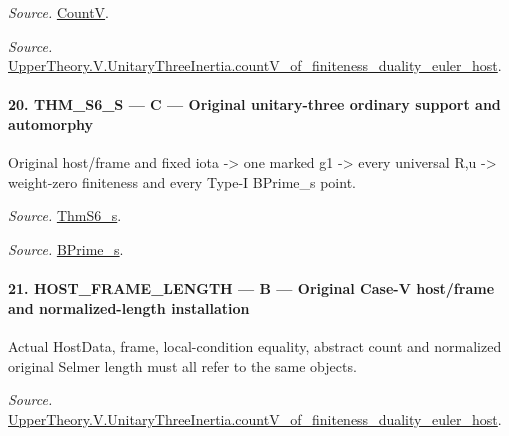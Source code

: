 \emph{Source.} \href{https://github.com/CocoSgt/riemann-hypothesis-lean/blob/7cbf7a0c32fca1badf05931879a37c3f8a2b03b4/src/Development/AutomorphicArithmetic/AutomorphicVarieties/HeightAndVanishing/Counts.lean#L69-L69}{CountV}.

\emph{Source.} \href{https://github.com/CocoSgt/riemann-hypothesis-lean/blob/7cbf7a0c32fca1badf05931879a37c3f8a2b03b4/src/Development/AutomorphicArithmetic/AutomorphicVarieties/ModularityArgument/ThresholdArguments/DenseThresholdCases/CountVOf.lean#L33-L60}{UpperTheory.V.UnitaryThreeInertia.countV\_\allowbreak of\_\allowbreak finiteness\_\allowbreak duality\_\allowbreak euler\_\allowbreak host}.



\paragraph{20. THM\_\allowbreak S6\_\allowbreak S — C — Original unitary-three ordinary support and automorphy}

Original host/frame and fixed iota -> one marked g1 -> every universal R,u -> weight-zero finiteness and every Type-I BPrime\_\allowbreak s point.

\emph{Source.} \href{https://github.com/CocoSgt/riemann-hypothesis-lean/blob/7cbf7a0c32fca1badf05931879a37c3f8a2b03b4/src/Development/AutomorphicArithmetic/AutomorphicVarieties/ModularityArgument/ThresholdArguments/DenseThresholdCases/ThmS6CoreS.lean#L17-L26}{ThmS6\_\allowbreak s}.

\emph{Source.} \href{https://github.com/CocoSgt/riemann-hypothesis-lean/blob/7cbf7a0c32fca1badf05931879a37c3f8a2b03b4/src/Development/AutomorphicArithmetic/AutomorphicVarieties/ModularityArgument/ThresholdArguments/DenseThresholdCases/ThmS6CoreS.lean#L12-L16}{BPrime\_\allowbreak s}.



\paragraph{21. HOST\_\allowbreak FRAME\_\allowbreak LENGTH — B — Original Case-V host/frame and normalized-length installation}

Actual HostData, frame, local-condition equality, abstract count and normalized original Selmer length must all refer to the same objects.

\emph{Source.} \href{https://github.com/CocoSgt/riemann-hypothesis-lean/blob/7cbf7a0c32fca1badf05931879a37c3f8a2b03b4/src/Development/AutomorphicArithmetic/AutomorphicVarieties/ModularityArgument/ThresholdArguments/DenseThresholdCases/CountVOf.lean#L33-L60}{UpperTheory.V.UnitaryThreeInertia.countV\_\allowbreak of\_\allowbreak finiteness\_\allowbreak duality\_\allowbreak euler\_\allowbreak host}.



